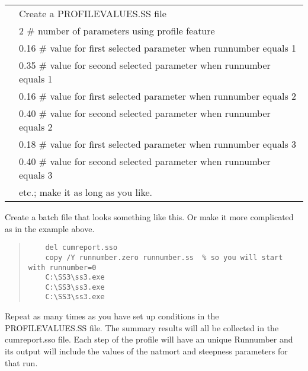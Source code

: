 	\begin{longtable}{p{0.5cm} p{16cm}}		
		& Create a PROFILEVALUES.SS file\\
		& 2	\# number of parameters using profile feature\\
		& 0.16	\# value for first selected parameter when runnumber equals 1\\
		& 0.35	\# value for second selected parameter when runnumber equals 1\\
		& 0.16	\# value for first selected parameter when runnumber equals 2\\
		& 0.40	\# value for second selected parameter when runnumber equals 2\\
		& 0.18	\# value for first selected parameter when runnumber equals 3\\
		& 0.40	\# value for second selected parameter when runnumber equals 3\\
		& etc.;  make it as long as you like.\\
	\end{longtable}

Create a batch file that looks something like this.  Or make it more complicated as in the example above.

\begin{quote}
\begin{verbatim}
	del cumreport.sso
	copy /Y runnumber.zero runnumber.ss  % so you will start with runnumber=0 
	C:\SS3\ss3.exe 
	C:\SS3\ss3.exe 
	C:\SS3\ss3.exe 
\end{verbatim}
\end{quote}


Repeat as many times as you have set up conditions in the PROFILEVALUES.SS file.
The summary results will all be collected in the cumreport.sso file.  Each step of the profile will have an unique Runnumber and its output will include the values of the natmort and steepness parameters for that run.

